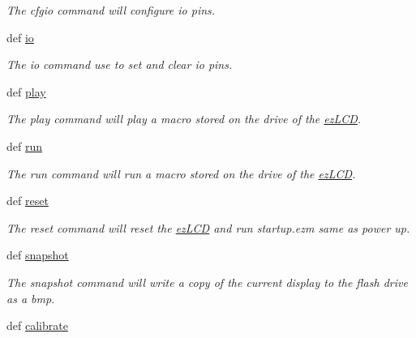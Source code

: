 \begin{DoxyCompactItemize}
\begin{DoxyCompactList}\small\item\em The cfgio command will configure io pins. \end{DoxyCompactList}\item 
def \hyperlink{group___general_gad7ece2d1355d0be3f7df9ce216cb5286}{io}
\begin{DoxyCompactList}\small\item\em The io command use to set and clear io pins. \end{DoxyCompactList}\item 
def \hyperlink{group___general_ga7d904406a210cad98e2d762dae76d553}{play}
\begin{DoxyCompactList}\small\item\em The play command will play a macro stored on the drive of the \hyperlink{classmodule_1_1ez_l_c_d3xx_1_1ez_l_c_d}{ez\-L\-C\-D}. \end{DoxyCompactList}\item 
def \hyperlink{group___general_ga0535965cf75c9a6f4f6039a1d1399d81}{run}
\begin{DoxyCompactList}\small\item\em The run command will run a macro stored on the drive of the \hyperlink{classmodule_1_1ez_l_c_d3xx_1_1ez_l_c_d}{ez\-L\-C\-D}. \end{DoxyCompactList}\item 
def \hyperlink{group___general_gad09d3f52045f116eb41726211f8909a4}{reset}
\begin{DoxyCompactList}\small\item\em The reset command will reset the \hyperlink{classmodule_1_1ez_l_c_d3xx_1_1ez_l_c_d}{ez\-L\-C\-D} and run startup.\-ezm same as power up. \end{DoxyCompactList}\item 
def \hyperlink{group___general_gaf906c49e26bdd7b09f58d80675a0d4f5}{snapshot}
\begin{DoxyCompactList}\small\item\em The snapshot command will write a copy of the current display to the flash drive as a bmp. \end{DoxyCompactList}\item 
\hypertarget{group___general_ga44f3daeee41eaaf35752594e6543a619}{def \hyperlink{group___general_ga44f3daeee41eaaf35752594e6543a619}{calibrate}}\label{group___general_ga44f3daeee41eaaf35752594e6543a619}


\end{DoxyCompactItemize}
